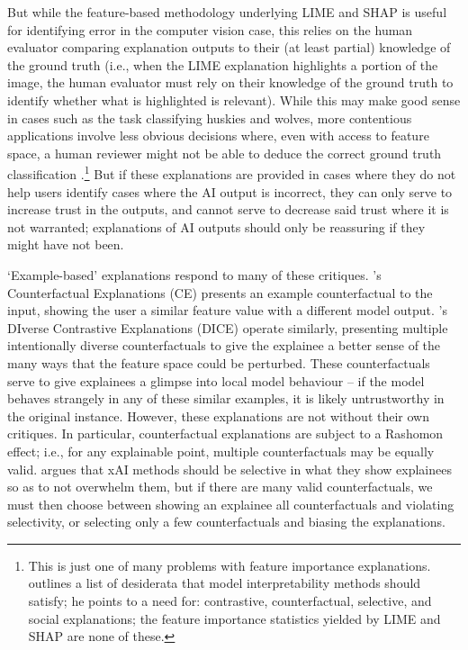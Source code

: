 But while the feature-based methodology underlying LIME and SHAP is useful for identifying error in the computer vision case, this relies on the human evaluator comparing explanation outputs to their (at least partial) knowledge of the ground truth (i.e., when the LIME explanation highlights a portion of the image, the human evaluator must rely on their knowledge of the ground truth to identify whether what is highlighted is relevant). While this may make good sense in cases such as the task classifying huskies and wolves, more contentious applications involve less obvious decisions where, even with access to feature space, a human reviewer might not be able to deduce the correct ground truth classification \cite{kumar_problems_2020,Markus-et-al}.\footnote{This is just one of many problems with feature importance explanations. \textcite{Miller} outlines a list of desiderata that model interpretability methods should satisfy; he points to a need for: contrastive, counterfactual, selective, and social explanations; the feature importance statistics yielded by LIME and SHAP are none of these.} But if these explanations are provided in cases where they do not help users identify cases where the AI output is incorrect, they can only serve to increase trust in the outputs, and cannot serve to decrease said trust where it is not warranted; explanations of AI outputs should only be reassuring if they might have not been.

`Example-based' explanations respond to many of these critiques. \textcite{Wachter-et-al}'s Counterfactual Explanations (CE) presents an example counterfactual to the input, showing the user a similar feature value with a different model output. \textcite{Mothilal-et-al}'s DIverse Contrastive Explanations (DICE) operate similarly, presenting multiple intentionally diverse counterfactuals to give the explainee a better sense of the many ways that the feature space could be perturbed. These counterfactuals serve to give explainees a glimpse into local model behaviour – if the model behaves strangely in any of these similar examples, it is likely untrustworthy in the original instance. However, these explanations are not without their own critiques. In particular, counterfactual explanations are subject to a Rashomon effect; i.e., for any explainable point, multiple counterfactuals may be equally valid. \textcite{Miller} argues that xAI methods should be selective in what they show explainees so as to not overwhelm them, but if there are many valid counterfactuals, we must then choose between showing an explainee all counterfactuals and violating selectivity, or selecting only a few counterfactuals and biasing the explanations.

